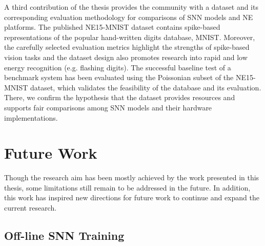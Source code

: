 A third contribution of the thesis provides the community with a dataset and its corresponding evaluation methodology for comparisons of SNN models and NE platforms.
The published NE15-MNIST dataset contains spike-based representations of the popular hand-written digits database, MNIST.
Moreover, the carefully selected evaluation metrics highlight the strengths of spike-based vision tasks and the dataset design also promotes research into rapid and low energy recognition (e.g. flashing digits).
The successful baseline test of a benchmark system has been evaluated using the Poissonian subset of the NE15-MNIST dataset, which validates the feasibility of the database and its evaluation.
There, we confirm the hypothesis that the dataset provides resources and supports fair comparisons among SNN models and their hardware implementations.

%



\section{Future Work}
Though the research aim has been mostly achieved by the work presented in this thesis, some limitations still remain to be addressed in the future.
In addition, this work has inspired new directions for future work to continue and expand the current research.

\subsection{Off-line SNN Training}

